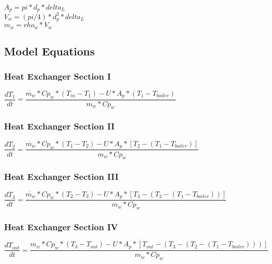     $ A_{p}=pi*d_{p}*delta_L $ \\
    $ V_{w}=(pi/4)*d_{p}^{2}*delta_L $ \\
    $ m_{w}=rho_{w}* V_{w} $ \\
    
\subsection{Model Equations}

\subsubsection{Heat Exchanger Section I}
$  \dfrac{dT_{1}}{dt} = \dfrac{\dot{m_{w}}*Cp_{w}*(T_{in}-T_{1}) - U*A_{p}*(T_{1}-T_{boiler}) }{m_{w}*Cp_{w}} $

\subsubsection{Heat Exchanger Section II}
$  \dfrac{dT_{2}}{dt} = \dfrac{\dot{m_{w}}*Cp_{w}*(T_{1}-T_{2}) - U*A_{p}*[T_{2}-(T_{1}-T_{boiler})]}{m_{w}*Cp_{w}}  $

\subsubsection{Heat Exchanger Section III}
$  \dfrac{dT_{3}}{dt} = \dfrac{\dot{m_{w}}*Cp_{w}*(T_{2}-T_{3}) - U*A_{p}*[T_{3}-(T_{2}-(T_{1}-T_{boiler}))]}{m_{w}*Cp_{w}}  $

\subsubsection{Heat Exchanger Section IV}
$  \dfrac{dT_{out}}{dt} = \dfrac{\dot{m_{w}}*Cp_{w}*(T_{3}-T_{out}) - U*A_{p}*[T_{out}-(T_{3}-(T_{2}-(T_{1}-T_{boiler})))]}{m_{w}*Cp_{w}}  $